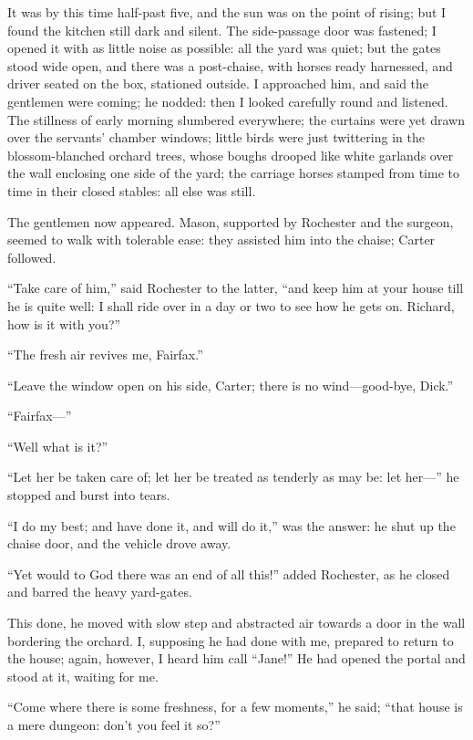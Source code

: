 It was by this time half-past five, and the sun was on the point of
rising; but I found the kitchen still dark and silent. The side-passage
door was fastened; I opened it with as little noise as possible: all the
yard was quiet; but the gates stood wide open, and there was a
post-chaise, with horses ready harnessed, and driver seated on the box,
stationed outside. I approached him, and said the gentlemen were
coming; he nodded: then I looked carefully round and listened. The
stillness of early morning slumbered everywhere; the curtains were yet
drawn over the servants' chamber windows; little birds were just
twittering in the blossom-blanched orchard trees, whose boughs drooped
like white garlands over the wall enclosing one side of the yard; the
carriage horses stamped from time to time in their closed stables: all
else was still.

The gentlemen now appeared. Mason, supported by \Mr{} Rochester and the
surgeon, seemed to walk with tolerable ease: they assisted him into the
chaise; Carter followed.

\enquote{Take care of him,} said \Mr{} Rochester to the latter,
\enquote{and keep him at your house till he is quite well: I shall ride
	over in a day or two to see how he gets on. Richard, how is it with
	you?}

\enquote{The fresh air revives me, Fairfax.}

\enquote{Leave the window open on his side, Carter; there is no
	wind---good-bye, Dick.}

\enquote{Fairfax---}

\enquote{Well what is it?}

\enquote{Let her be taken care of; let her be treated as tenderly as may
	be: let her---} he stopped and burst into tears.

\enquote{I do my best; and have done it, and will do it,} was the
answer: he shut up the chaise door, and the vehicle drove away.

\enquote{Yet would to God there was an end of all this!} added \Mr{}
Rochester, as he closed and barred the heavy yard-gates.

This done, he moved with slow step and abstracted air towards a door in
the wall bordering the orchard. I, supposing he had done with me,
prepared to return to the house; again, however, I heard him call
\enquote{Jane!} He had opened the portal and stood at it, waiting for
me.

\enquote{Come where there is some freshness, for a few moments,} he
said; \enquote{that house is a mere dungeon: don't you feel it so?}

